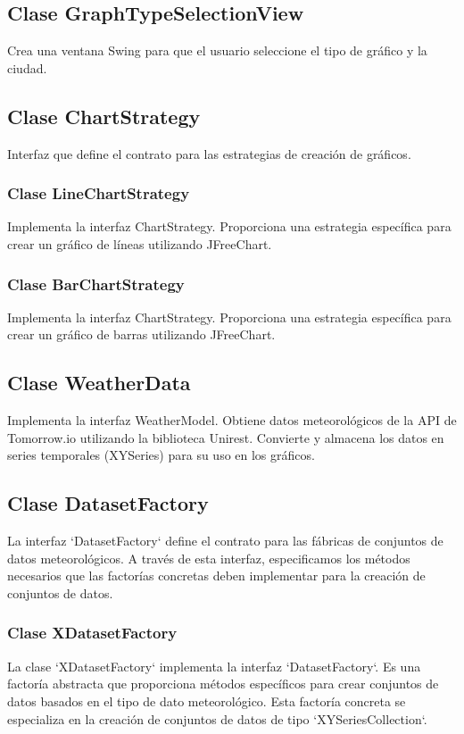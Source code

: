 \documentclass{article}
\begin{document}
\subsection{Clase GraphTypeSelectionView}
Crea una ventana Swing para que el usuario seleccione el tipo de gráfico y la ciudad.

\subsection{Clase ChartStrategy}
Interfaz que define el contrato para las estrategias de creación de gráficos.

\subsubsection{Clase LineChartStrategy}
Implementa la interfaz ChartStrategy. Proporciona una estrategia específica para crear un gráfico de líneas utilizando JFreeChart.

\subsubsection{Clase BarChartStrategy}
Implementa la interfaz ChartStrategy. Proporciona una estrategia específica para crear un gráfico de barras utilizando JFreeChart.

\subsection{Clase WeatherData}
Implementa la interfaz WeatherModel. Obtiene datos meteorológicos de la API de Tomorrow.io utilizando la biblioteca Unirest. Convierte y almacena los datos en series temporales (XYSeries) para su uso en los gráficos.

\subsection{Clase DatasetFactory}
La interfaz `DatasetFactory` define el contrato para las fábricas de conjuntos de datos meteorológicos. A través de esta interfaz, especificamos los métodos necesarios que las factorías concretas deben implementar para la creación de conjuntos de datos.

\subsubsection{Clase XDatasetFactory}
La clase `XDatasetFactory` implementa la interfaz `DatasetFactory`. Es una factoría abstracta que proporciona métodos específicos para crear conjuntos de datos basados en el tipo de dato meteorológico. Esta factoría concreta se especializa en la creación de conjuntos de datos de tipo `XYSeriesCollection`.
\end{document}
